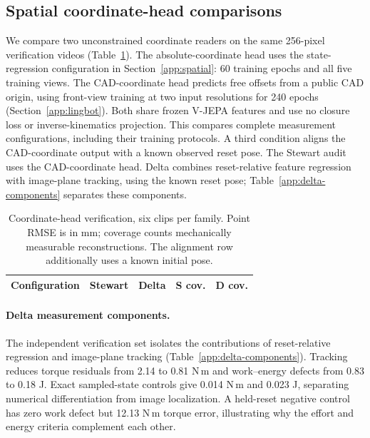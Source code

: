 \documentclass[10pt,twocolumn,letterpaper]{article}
\begin{document}
\subsection{Spatial coordinate-head comparisons}
We compare two unconstrained coordinate readers on the same 256-pixel verification videos (Table~\ref{app:observer-ablation}). The absolute-coordinate head uses the state-regression configuration in Section~\ref{app:spatial}: 60 training epochs and all five training views. The CAD-coordinate head predicts free offsets from a public CAD origin, using front-view training at two input resolutions for 240 epochs (Section~\ref{app:lingbot}). Both share frozen V-JEPA features and use no closure loss or inverse-kinematics projection. This compares complete measurement configurations, including their training protocols. A third condition aligns the CAD-coordinate output with a known observed reset pose. The Stewart audit uses the CAD-coordinate head. Delta combines reset-relative feature regression with image-plane tracking, using the known reset pose; Table~\ref{app:delta-components} separates these components.

\begin{table}[t]
\caption{Coordinate-head verification, six clips per family. Point RMSE is in mm; coverage counts mechanically measurable reconstructions. The alignment row additionally uses a known initial pose.}
\label{app:observer-ablation}
\centering\small
\setlength{\tabcolsep}{3pt}
\begin{tabular}{lrrrr}
\toprule
Configuration & Stewart & Delta & S cov. & D cov.\\
\midrule

\bottomrule
\end{tabular}
\end{table}

\paragraph{Delta measurement components.}
The independent verification set isolates the contributions of reset-relative regression and image-plane tracking (Table~\ref{app:delta-components}). Tracking reduces torque residuals from 2.14 to 0.81 N\,m and work--energy defects from 0.83 to 0.18 J. Exact sampled-state controls give 0.014 N\,m and 0.023 J, separating numerical differentiation from image localization. A held-reset negative control has zero work defect but 12.13 N\,m torque error, illustrating why the effort and energy criteria complement each other.
\end{document}

